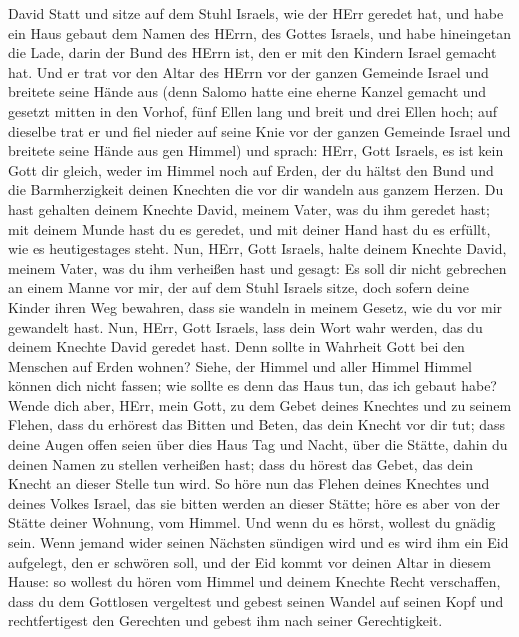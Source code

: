 David Statt und sitze auf dem Stuhl Israels, wie der HErr geredet hat,
und habe ein Haus gebaut dem Namen des HErrn, des Gottes Israels,
 und habe hineingetan die Lade, darin der Bund des HErrn
ist, den er mit den Kindern Israel gemacht hat.  Und er
trat vor den Altar des HErrn vor der ganzen Gemeinde Israel und breitete
seine Hände aus  (denn Salomo hatte eine eherne Kanzel
gemacht und gesetzt mitten in den Vorhof, fünf Ellen lang und breit und
drei Ellen hoch; auf dieselbe trat er und fiel nieder auf seine Knie vor
der ganzen Gemeinde Israel und breitete seine Hände aus gen Himmel)
 und sprach: HErr, Gott Israels, es ist kein Gott dir
gleich, weder im Himmel noch auf Erden, der du hältst den Bund und die
Barmherzigkeit deinen Knechten die vor dir wandeln aus ganzem Herzen.
 Du hast gehalten deinem Knechte David, meinem Vater, was
du ihm geredet hast; mit deinem Munde hast du es geredet, und mit deiner
Hand hast du es erfüllt, wie es heutigestages steht.  Nun,
HErr, Gott Israels, halte deinem Knechte David, meinem Vater, was du ihm
verheißen hast und gesagt: Es soll dir nicht gebrechen an einem Manne
vor mir, der auf dem Stuhl Israels sitze, doch sofern deine Kinder ihren
Weg bewahren, dass sie wandeln in meinem Gesetz, wie du vor mir
gewandelt hast.  Nun, HErr, Gott Israels, lass dein Wort
wahr werden, das du deinem Knechte David geredet hast. 
Denn sollte in Wahrheit Gott bei den Menschen auf Erden wohnen? Siehe,
der Himmel und aller Himmel Himmel können dich nicht fassen; wie sollte
es denn das Haus tun, das ich gebaut habe?  Wende dich
aber, HErr, mein Gott, zu dem Gebet deines Knechtes und zu seinem
Flehen, dass du erhörest das Bitten und Beten, das dein Knecht vor dir
tut;  dass deine Augen offen seien über dies Haus Tag und
Nacht, über die Stätte, dahin du deinen Namen zu stellen verheißen hast;
dass du hörest das Gebet, das dein Knecht an dieser Stelle tun wird.
 So höre nun das Flehen deines Knechtes und deines Volkes
Israel, das sie bitten werden an dieser Stätte; höre es aber von der
Stätte deiner Wohnung, vom Himmel. Und wenn du es hörst, wollest du
gnädig sein.  Wenn jemand wider seinen Nächsten sündigen
wird und es wird ihm ein Eid aufgelegt, den er schwören soll, und der
Eid kommt vor deinen Altar in diesem Hause:  so wollest du
hören vom Himmel und deinem Knechte Recht verschaffen, dass du dem
Gottlosen vergeltest und gebest seinen Wandel auf seinen Kopf und
rechtfertigest den Gerechten und gebest ihm nach seiner Gerechtigkeit.
